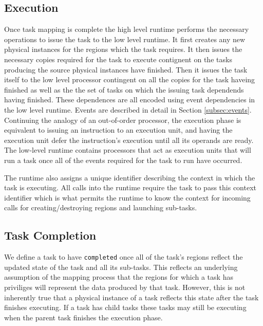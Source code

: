 \subsection{Execution}
\label{subsec:execution}
Once task mapping is complete the high level runtime performs the necessary operations
to issue the task to the low level runtime.  It first creates any new physical instances
for the regions which the task requires.  It then issues the necessary copies required
for the task to execute contignent on the tasks producing the source physical instances
have finished.  Then it issues the task itself to the low level processor contingent
on all the copies for the task haveing finished as well as the the set of tasks
on which the issuing task dependends having finished.  These dependences are all encoded
using event dependencies in the low level runtime.  Events are described
in detail in Section \ref{subsec:events}.  Continuing the analogy of an out-of-order
processor, the execution phase is equivalent to issuing an instruction to an
execution unit, and having the execution unit defer the instruction's execution until all its
operands are ready.  The low-level runtime contains processors that act as execution
units that will run a task once all of the events required for the task to run
have occurred. 


The runtime also assigns a unique identifier describing the context
in which the task is executing.  All calls into the runtime require the task
to pass this context identifier which is what permits the runtime to know the context
for incoming calls for creating/destroying regions and launching sub-tasks.  

\subsection{Task Completion}
\label{subsec:cleanup}
We define a task to have {\tt completed} once all of the task's regions reflect
the updated state of the task and all its sub-tasks.  This reflects an underlying assumption 
of the mapping process that the regions for which a task has priviliges will represent the data produced 
by that task.  However, this is not inherently true that a physical instance of a task reflects
this state after the task finishes executing.  If a task has child tasks these tasks may
still be executing when the parent task finishes the execution phase.  

